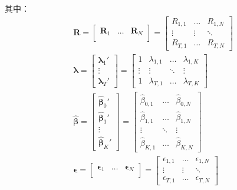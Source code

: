 \documentclass[11pt]{article}
\begin{document}
其中：
\begin{gather*}
    \bm{R} = \begin{bmatrix} \bm{R}_1 & \dots & \bm{R}_N \\ \end{bmatrix}
    = \begin{bmatrix} R_{1,1} & \dots & R_{1,N} \\ \vdots & \vdots & \ddots \\ R_{T,1} & \dots & R_{T,N} \end{bmatrix} \\
    \bm{\lambda} = \begin{bmatrix} \bm{\lambda}_{1}' \\ \vdots \\ \bm{\lambda}_{T}' \end{bmatrix}
    = \begin{bmatrix} 1 & \lambda_{1,1} & \dots & \lambda_{1,K} \\ \vdots & \vdots & \ddots & \vdots \\ 1 & \lambda_{T,1} & \dots & \lambda_{T,K} \end{bmatrix} 
    \\
    \hat{\bm{\beta}}
    = \begin{bmatrix} \hat{\bm{\beta}}_{0}' \\ \hat{\bm{\beta}}_{1}' \\ \vdots \\ \hat{\bm{\beta}}_{K}' \end{bmatrix}
    = \begin{bmatrix} \hat{\beta}_{0,1} & \dots & \hat{\beta}_{0,N} \\ \hat{\beta}_{1,1} & \dots & \hat{\beta}_{1,N} \\ \vdots & \ddots & \vdots \\ \hat{\beta}_{K,1} & \dots & \hat{\beta}_{K,N} \end{bmatrix}
    \\
    \bm{\epsilon} = \begin{bmatrix}
        \bm{\epsilon}_1 & \dots & \bm{\epsilon}_N \\
    \end{bmatrix}
    = \begin{bmatrix} \epsilon_{1,1} & \dots & \epsilon_{1,N} \\ \vdots & \vdots & \ddots \\ \epsilon_{T,1} & \dots & \epsilon_{T,N} \end{bmatrix}
\end{gather*}
\end{document}
